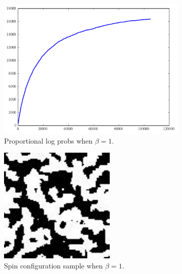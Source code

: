 \begin{figure}
	\begin{subfigure}[b]{.49\textwidth}
		\centering
		\includegraphics[width=\textwidth]{beta1_logprobs.pdf}
		\caption{Proportional log probs when $\beta = 1$.}
		\label{fig:lprobs1}
	\end{subfigure}
	\begin{subfigure}[b]{.49\textwidth}
		\centering
		\includegraphics[width=.75\textwidth]{beta1.pdf}
		\caption{Spin configuration sample when $\beta = 1$.}
		\label{fig:config1}
	\end{subfigure}
	\begin{subfigure}[b]{.49\textwidth}
		\centering

\end{subfigure}
\end{figure}

